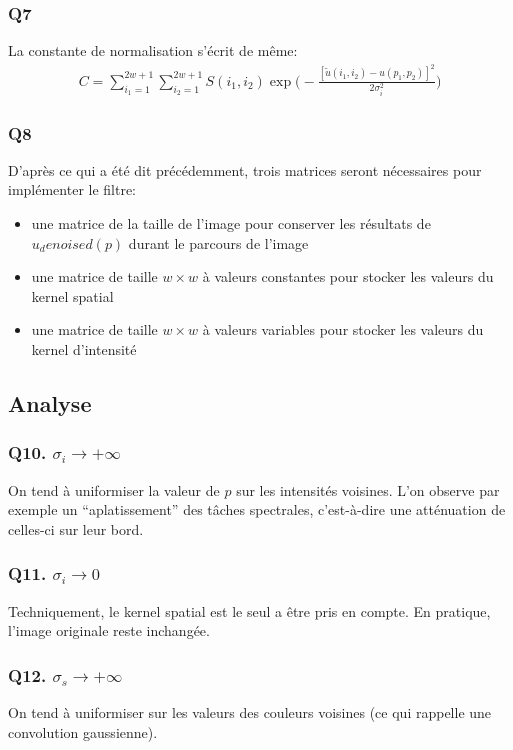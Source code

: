 \documentclass{article}
\begin{document}
\subsubsection*{Q7}
La constante de normalisation s'écrit de même:
\begin{equation*}\begin{split}
C = \displaystyle\sum_{i_1 = 1}^{2w + 1}
\displaystyle\sum_{i_2 = 1}^{2w + 1} S(i_1,i_2) \exp{ \big ( - \frac{[\tilde{u}(i_1, i_2) - u(p_1, p_2)]^2}{2\sigma_i^2} \big )}
\end{split}\end{equation*}
\subsubsection*{Q8}
D'après ce qui a été dit précédemment, trois matrices seront nécessaires pour implémenter le filtre:
\begin{itemize}
\item une matrice de la taille de l'image pour conserver les résultats de $u_denoised(p)$ durant le parcours de l'image
\item une matrice de taille $w \times w$ à valeurs constantes pour stocker les valeurs du kernel spatial
\item une matrice de taille $w \times w$ à valeurs variables pour stocker les valeurs du kernel d'intensité
\end{itemize}
\subsection{Analyse}
\subsubsection*{Q10. $\sigma_i \rightarrow + \infty $}
On tend à uniformiser la valeur de $p$ sur les intensités voisines. L'on observe par exemple un ``aplatissement'' des tâches spectrales, c'est-à-dire une atténuation de celles-ci sur leur bord.
\subsubsection*{Q11. $\sigma_i \rightarrow 0 $}
Techniquement, le kernel spatial est le seul a être 	pris en compte. En pratique, l'image originale reste inchangée.
\subsubsection*{Q12. $\sigma_s \rightarrow + \infty $}
On tend à uniformiser sur les valeurs des couleurs voisines (ce qui rappelle une convolution gaussienne).
\end{document}
